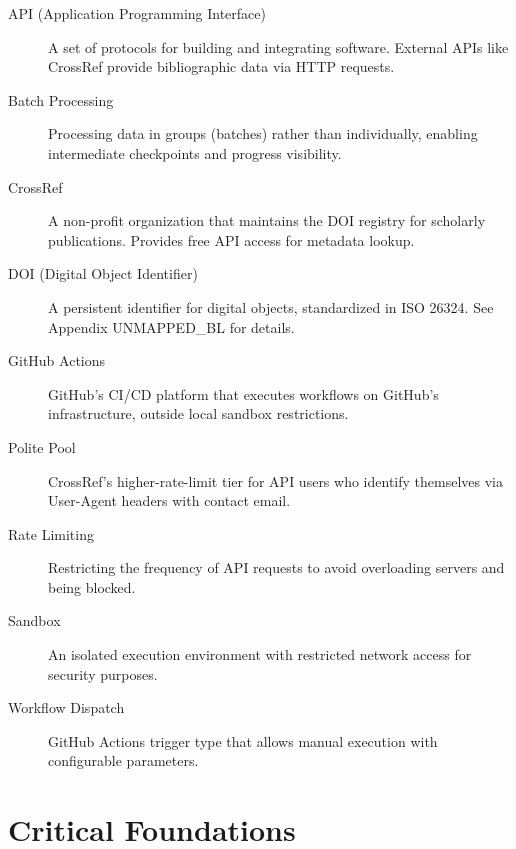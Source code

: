 \begin{description}
    \item[API (Application Programming Interface)] A set of protocols for building and integrating software. External APIs like CrossRef provide bibliographic data via HTTP requests.

    \item[Batch Processing] Processing data in groups (batches) rather than individually, enabling intermediate checkpoints and progress visibility.

    \item[CrossRef] A non-profit organization that maintains the DOI registry for scholarly publications. Provides free API access for metadata lookup.

    \item[DOI (Digital Object Identifier)] A persistent identifier for digital objects, standardized in ISO 26324. See Appendix UNMAPPED_BL for details.

    \item[GitHub Actions] GitHub's CI/CD platform that executes workflows on GitHub's infrastructure, outside local sandbox restrictions.

    \item[Polite Pool] CrossRef's higher-rate-limit tier for API users who identify themselves via User-Agent headers with contact email.

    \item[Rate Limiting] Restricting the frequency of API requests to avoid overloading servers and being blocked.

    \item[Sandbox] An isolated execution environment with restricted network access for security purposes.

    \item[Workflow Dispatch] GitHub Actions trigger type that allows manual execution with configurable parameters.
\end{description}

\section{Critical Foundations}
\label{sec:api-foundations}

